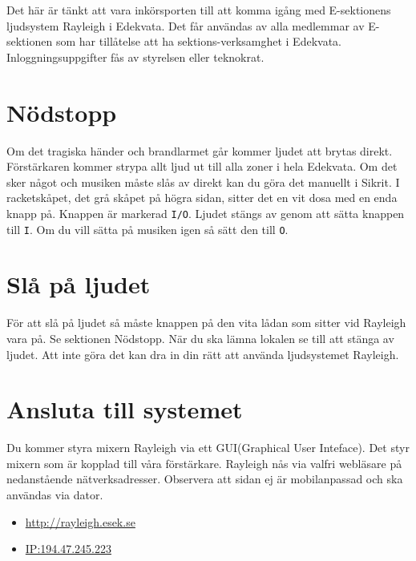 \documentclass[10pt]{article}
\def\doctitle{Rayleigh for Dummies}
\begin{document}
    \heading{\doctitle}
    \newline \newline
    Det här är tänkt att vara inkörsporten till att komma igång med E-sektionens ljudsystem Rayleigh i Edekvata. Det får användas av alla medlemmar av E-sektionen som har tillåtelse att ha sektions-verksamghet i Edekvata. Inloggningsuppgifter fås av styrelsen eller teknokrat. 
    
    \section{Nödstopp}
        Om det tragiska händer och brandlarmet går kommer ljudet att brytas direkt. Förstärkaren kommer strypa allt ljud ut till alla zoner i hela Edekvata.
        \newline \newline
        Om det sker något och musiken måste slås av direkt kan du göra det manuellt i Sikrit. I racketskåpet, det grå skåpet på högra sidan, sitter det en vit dosa med en enda knapp på. Knappen är markerad \texttt{I/O}. Ljudet stängs av genom att sätta knappen till \texttt{I}. Om du vill sätta på musiken igen så sätt den till \texttt{O}.
    
    \section{Slå på ljudet}
        För att slå på ljudet så måste knappen på den vita lådan som sitter vid Rayleigh vara på. Se sektionen Nödstopp. När du ska lämna lokalen se till att stänga av ljudet. Att inte göra det kan dra in din rätt att använda ljudsystemet Rayleigh. 
    
    \section{Ansluta till systemet}
         Du kommer styra mixern Rayleigh via ett GUI(Graphical User Inteface). Det styr mixern som är kopplad till våra förstärkare. Rayleigh nås via valfri webläsare på nedanstående nätverksadresser. Observera att sidan ej är mobilanpassad och ska användas via dator.
        \begin{itemize}
            \item \href{http://rayleigh.esek.se}{http://rayleigh.esek.se}
            \item \href{http://194.47.245.223}{IP:194.47.245.223}
        \end{itemize}
        
\end{document}
